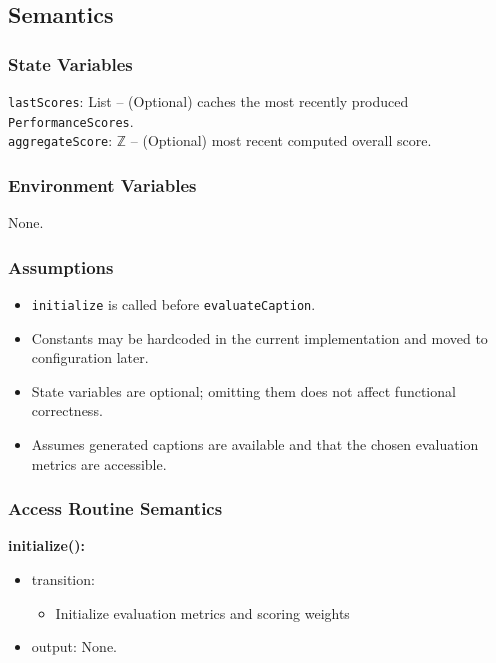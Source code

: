\documentclass[12pt, titlepage]{article}
\begin{document}
\subsection{Semantics}

\subsubsection{State Variables}
\texttt{lastScores}: List -- (Optional) caches the most recently produced \texttt{PerformanceScores}.\\
\texttt{aggregateScore}: $\mathbb{Z}$ -- (Optional) most recent computed overall score.

\subsubsection{Environment Variables}
None.

\subsubsection{Assumptions}
\begin{itemize}
  \item \texttt{initialize} is called before \texttt{evaluateCaption}.
  \item Constants may be hardcoded in the current implementation and moved to configuration later.
  \item State variables are optional; omitting them does not affect functional correctness.
  \item Assumes generated captions are available and that the chosen evaluation metrics are accessible.
\end{itemize}

\subsubsection{Access Routine Semantics}
\noindent \textbf{initialize():}
\begin{itemize}
  \item transition:
  \begin{itemize}
    \item Initialize evaluation metrics and scoring weights
  \end{itemize}
  \item output: None.
\end{itemize}
\end{document}
